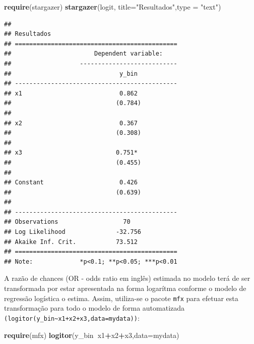 \documentclass[12pt,brazil,]{book}
\newenvironment{Shaded}{\begin{snugshade}}{\end{snugshade}}
\newcommand{\DataTypeTok}[1]{\textcolor[rgb]{0.13,0.29,0.53}{#1}}
\newcommand{\KeywordTok}[1]{\textcolor[rgb]{0.13,0.29,0.53}{\textbf{#1}}}
\newcommand{\NormalTok}[1]{#1}
\newcommand{\OperatorTok}[1]{\textcolor[rgb]{0.81,0.36,0.00}{\textbf{#1}}}
\newcommand{\StringTok}[1]{\textcolor[rgb]{0.31,0.60,0.02}{#1}}
\begin{document}
\begin{Shaded}
\begin{Highlighting}[]
\KeywordTok{require}\NormalTok{(stargazer)}
\KeywordTok{stargazer}\NormalTok{(logit, }\DataTypeTok{title=}\StringTok{"Resultados"}\NormalTok{,}\DataTypeTok{type =} \StringTok{"text"}\NormalTok{)}
\end{Highlighting}
\end{Shaded}

\begin{verbatim}
## 
## Resultados
## =============================================
##                       Dependent variable:    
##                   ---------------------------
##                              y_bin           
## ---------------------------------------------
## x1                           0.862           
##                             (0.784)          
##                                              
## x2                           0.367           
##                             (0.308)          
##                                              
## x3                          0.751*           
##                             (0.455)          
##                                              
## Constant                     0.426           
##                             (0.639)          
##                                              
## ---------------------------------------------
## Observations                  70             
## Log Likelihood              -32.756          
## Akaike Inf. Crit.           73.512           
## =============================================
## Note:             *p<0.1; **p<0.05; ***p<0.01
\end{verbatim}

A razão de chances (OR - odds ratio em inglês) estimada no modelo terá
de ser transformada por estar apresentada na forma logarítma conforme o
modelo de regressão logística o estima. Assim, utiliza-se o pacote
\texttt{mfx} para efetuar esta transformação para todo o modelo de forma
automatizada
\texttt{(logitor(y\_bin\textasciitilde{}x1+x2+x3,data=mydata))}:

\begin{Shaded}
\begin{Highlighting}[]
\KeywordTok{require}\NormalTok{(mfx)}
\KeywordTok{logitor}\NormalTok{(y_bin}\OperatorTok{~}\NormalTok{x1}\OperatorTok{+}\NormalTok{x2}\OperatorTok{+}\NormalTok{x3,}\DataTypeTok{data=}\NormalTok{mydata)}
\end{Highlighting}
\end{Shaded}
\end{document}
